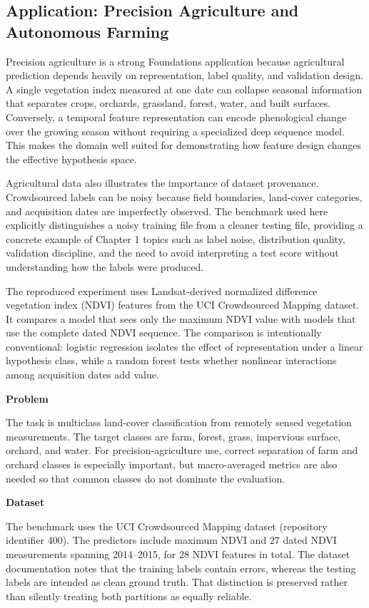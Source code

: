 \subsection{Application: Precision Agriculture and Autonomous Farming}

Precision agriculture is a strong Foundations application because agricultural prediction depends heavily on representation, label quality, and validation design. A single vegetation index measured at one date can collapse seasonal information that separates crops, orchards, grassland, forest, water, and built surfaces. Conversely, a temporal feature representation can encode phenological change over the growing season without requiring a specialized deep sequence model. This makes the domain well suited for demonstrating how feature design changes the effective hypothesis space.

Agricultural data also illustrates the importance of dataset provenance. Crowdsourced labels can be noisy because field boundaries, land-cover categories, and acquisition dates are imperfectly observed. The benchmark used here explicitly distinguishes a noisy training file from a cleaner testing file, providing a concrete example of Chapter 1 topics such as label noise, distribution quality, validation discipline, and the need to avoid interpreting a test score without understanding how the labels were produced.

The reproduced experiment uses Landsat-derived normalized difference vegetation index (NDVI) features from the UCI Crowdsourced Mapping dataset. It compares a model that sees only the maximum NDVI value with models that use the complete dated NDVI sequence. The comparison is intentionally conventional: logistic regression isolates the effect of representation under a linear hypothesis class, while a random forest tests whether nonlinear interactions among acquisition dates add value.

\textbf{Problem}

The task is multiclass land-cover classification from remotely sensed vegetation measurements. The target classes are farm, forest, grass, impervious surface, orchard, and water. For precision-agriculture use, correct separation of farm and orchard classes is especially important, but macro-averaged metrics are also needed so that common classes do not dominate the evaluation.

\textbf{Dataset}

The benchmark uses the UCI Crowdsourced Mapping dataset (repository identifier 400). The predictors include maximum NDVI and 27 dated NDVI measurements spanning 2014--2015, for 28 NDVI features in total. The dataset documentation notes that the training labels contain errors, whereas the testing labels are intended as clean ground truth. That distinction is preserved rather than silently treating both partitions as equally reliable.

